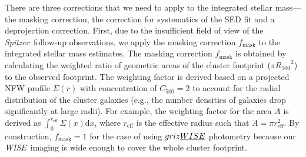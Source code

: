 \documentclass[useAMS,usenatbib,iop,numberedappendix]{mn2e}
\newcommand{\Rfiveoo}{\ensuremath{R_{500}}}
\newcommand{\dif}{\ensuremath{\mathrm{d}}}
\newcommand{\Spitzer}{\emph{Spitzer}}
\newcommand{\WISE}{\emph{WISE}}
\begin{document}
There are three corrections that we need to apply to the integrated stellar mass---the masking correction, the correction for systematics of the SED fit and a deprojection correction.
First, due to the insufficient field of view of the \Spitzer\ follow-up observations, we apply the masking correction $f_{\mathrm{mask}}$ to the integrated stellar mass estimates.
The masking correction $f_{\mathrm{mask}}$ is obtained by calculating the weighted ratio of geometric areas of the cluster footprint ($\pi\Rfiveoo^2$) to the observed footprint.
The weighting factor is derived based on a projected NFW profile $\Sigma(r)$ with concentration of $C_{500}=2$ \citep{lin04a,burg14,chiu16b,hennig17} to account for the radial distribution of the cluster galaxies (e.g., the number densities of galaxies drop significantly at large radii).
For example, the weighting factor for the area $A$ is derived as 
$\int_{0}^{r_{\mathrm{eff}}}\Sigma(x)\dif x$,
where $r_{\mathrm{eff}}$ is the effective radius such that $A = \pi r_{\mathrm{eff}}^2$.
By construction, $f_{\mathrm{mask}} = 1$ for the case of using $griz\WISE$ photometry because our \WISE\ imaging is wide enough to cover the whole cluster footprint.
\end{document}
